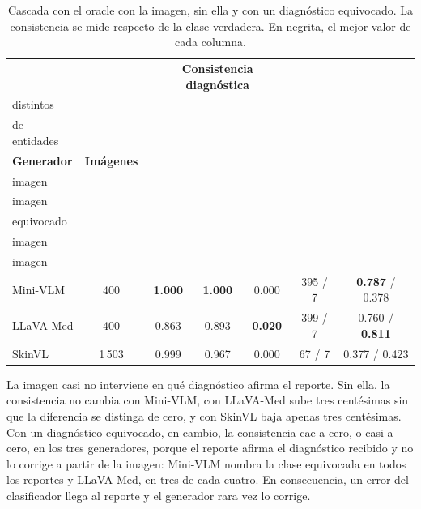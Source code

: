 \begin{table}[H]
    \centering
    \caption{Cascada con el oracle con la imagen, sin ella y con un diagnóstico equivocado. La consistencia se mide respecto de la clase verdadera. En negrita, el mejor valor de cada columna.}

    \label{tab:res_gen_ablaciones}
    \small
    \setlength{\tabcolsep}{3pt}
    \begin{tabularx}{\textwidth}{@{}>{\raggedright\arraybackslash}X cccccc@{}}
        \toprule
        & & \multicolumn{3}{c}{\textbf{Consistencia diagnóstica}} & \textbf{\encabezado{Reportes\\distintos}}
            & \textbf{\encabezado{Cobertura\\de entidades}} \\
        \cmidrule(lr){3-5}
        \textbf{Generador} & \textbf{Imágenes} & \textbf{\encabezado{Con\\imagen}}~$\uparrow$ & \textbf{\encabezado{Sin\\imagen}}~$\uparrow$
            & \textbf{\encabezado{Diagnóstico\\equivocado}}~$\uparrow$ & \textbf{\encabezado{Con / sin\\imagen}}
            & \textbf{\encabezado{Con / sin\\imagen}} \\
        \midrule
        Mini-VLM & 400 & \textbf{1.000} & \textbf{1.000} & 0.000 & 395 / 7 & \textbf{0.787} / 0.378 \\
        LLaVA-Med & 400 & 0.863 & 0.893 & \textbf{0.020} & 399 / 7 & 0.760 / \textbf{0.811} \\
        SkinVL & 1\,503 & 0.999 & 0.967 & 0.000 & 67 / 7 & 0.377 / 0.423 \\
        \bottomrule
    \end{tabularx}
\end{table}

La imagen casi no interviene en qué diagnóstico afirma el reporte. Sin ella, la consistencia no cambia con Mini-VLM, con
LLaVA-Med sube tres centésimas sin que la diferencia se distinga de cero, y con SkinVL baja apenas tres centésimas. Con
un diagnóstico equivocado, en cambio, la consistencia cae a cero, o casi a cero, en los tres generadores, porque el reporte afirma el
diagnóstico recibido y no lo corrige a partir de la imagen: Mini-VLM nombra la clase equivocada en todos los reportes
y LLaVA-Med, en tres de cada cuatro. En consecuencia, un error del clasificador llega al reporte y el generador rara vez lo corrige.


